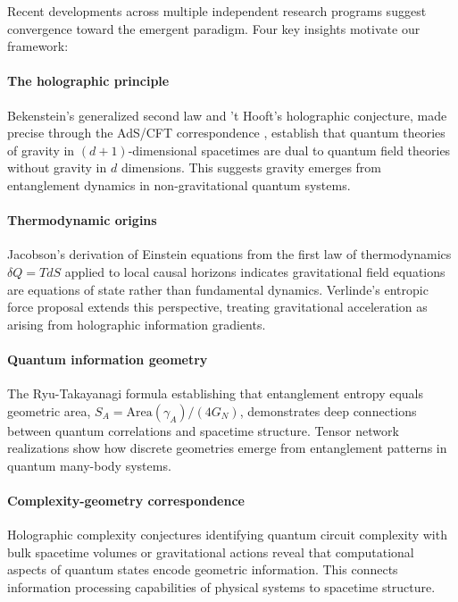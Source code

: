 \documentclass[11pt,a4paper]{article}
\theoremstyle{remark}
\theoremstyle{definition}
\begin{document}
Recent developments across multiple independent research programs suggest convergence toward the emergent paradigm. Four key insights motivate our framework:

\paragraph{The holographic principle} Bekenstein's generalized second law and 't Hooft's holographic conjecture, made precise through the AdS/CFT correspondence \cite{Maldacena1998}, establish that quantum theories of gravity in $(d+1)$-dimensional spacetimes are dual to quantum field theories without gravity in $d$ dimensions. This suggests gravity emerges from entanglement dynamics in non-gravitational quantum systems.

\paragraph{Thermodynamic origins} Jacobson's derivation \cite{Jacobson1995} of Einstein equations from the first law of thermodynamics $\delta Q = T dS$ applied to local causal horizons indicates gravitational field equations are equations of state rather than fundamental dynamics. Verlinde's entropic force proposal \cite{Verlinde2011} extends this perspective, treating gravitational acceleration as arising from holographic information gradients.

\paragraph{Quantum information geometry} The Ryu-Takayanagi formula \cite{Ryu2006} establishing that entanglement entropy equals geometric area, $S_A = \text{Area}(\gamma_A)/(4G_N)$, demonstrates deep connections between quantum correlations and spacetime structure. Tensor network realizations \cite{Swingle2012,Pastawski2015} show how discrete geometries emerge from entanglement patterns in quantum many-body systems.

\paragraph{Complexity-geometry correspondence} Holographic complexity conjectures \cite{Susskind2014,Brown2016} identifying quantum circuit complexity with bulk spacetime volumes or gravitational actions reveal that computational aspects of quantum states encode geometric information. This connects information processing capabilities of physical systems to spacetime structure.
\end{document}
